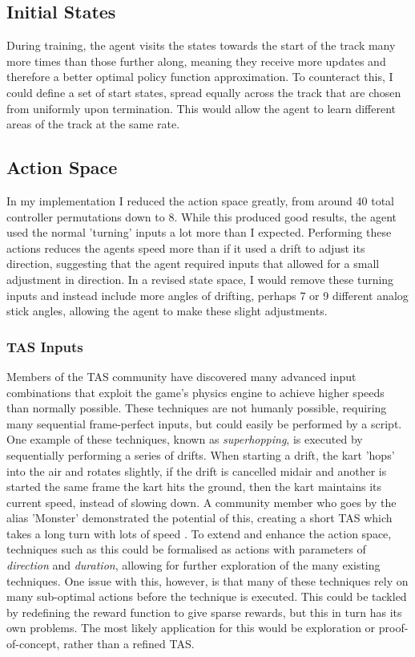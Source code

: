 \subsection{Initial States}
During training, the agent visits the states towards the start of the track many more times than those further along, meaning they receive more updates and therefore a better optimal policy function approximation. To counteract this, I could define a set of start states, spread equally across the track that are chosen from uniformly upon termination. This would allow the agent to learn different areas of the track at the same rate.
\subsection{Action Space}
In my implementation I reduced the action space greatly, from around 40 total controller permutations down to 8. While this produced good results, the agent used the normal 'turning' inputs a lot more than I expected. Performing these actions reduces the agents speed more than if it used a drift to adjust its direction, suggesting that the agent required inputs that allowed for a small adjustment in direction. In a revised state space, I would remove these turning inputs and instead include more angles of drifting, perhaps 7 or 9 different analog stick angles, allowing the agent to make these slight adjustments. 
\subsubsection{TAS Inputs}
Members of the TAS community have discovered many advanced input combinations that exploit the game's physics engine to achieve higher speeds than normally possible. These techniques are not humanly possible, requiring many sequential frame-perfect inputs, but could easily be performed by a script. One example of these techniques, known as \textit{superhopping}, is executed by sequentially performing a series of drifts. When starting a drift, the kart 'hops' into the air and rotates slightly, if the drift is cancelled midair and another is started the same frame the kart hits the ground, then the kart maintains its current speed, instead of slowing down. A community member who goes by the alias 'Monster' demonstrated the potential of this, creating a short TAS which takes a long turn with lots of speed \cite{Superhopping}. To extend and enhance the action space, techniques such as this could be formalised as actions with parameters of \textit{direction} and \textit{duration}, allowing for further exploration of the many existing techniques. One issue with this, however, is that many of these techniques rely on many sub-optimal actions before the technique is executed. This could be tackled by redefining the reward function to give sparse rewards, but this in turn has its own problems. The most likely application for this would be exploration or proof-of-concept, rather than a refined TAS.
